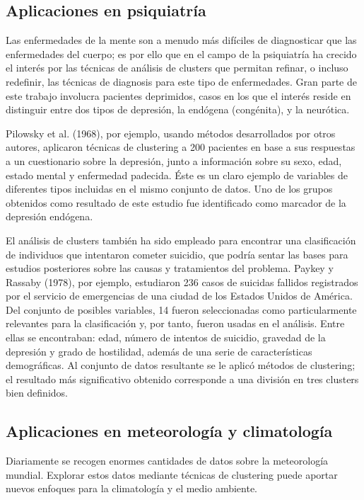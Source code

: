 \subsection{Aplicaciones en psiquiatría}

Las enfermedades de la mente son a menudo más difíciles de diagnosticar que las enfermedades del cuerpo; es por ello que en el campo de la psiquiatría ha crecido el interés por las técnicas de análisis de clusters que permitan refinar, o incluso redefinir, las técnicas de diagnosis para este tipo de enfermedades. Gran parte de este trabajo involucra pacientes deprimidos, casos en los que el interés reside en distinguir entre dos tipos de depresión, la endógena (congénita), y la neurótica.

Pilowsky et al. (1968), por ejemplo, usando métodos desarrollados por otros autores, aplicaron técnicas de clustering a 200 pacientes en base a sus respuestas a un cuestionario sobre la depresión, junto a información sobre su sexo, edad, estado mental y enfermedad padecida. Éste es un claro ejemplo de variables de diferentes tipos incluidas en el mismo conjunto de datos. Uno de los grupos obtenidos como resultado de este estudio fue identificado como marcador de la depresión endógena.

El análisis de clusters también ha sido empleado para encontrar una clasificación de individuos que intentaron cometer suicidio, que podría sentar las bases para estudios posteriores sobre las causas y tratamientos del problema. Paykey y Rassaby (1978), por ejemplo, estudiaron 236 casos de suicidas fallidos registrados por el servicio de emergencias de una ciudad de los Estados Unidos de América. Del conjunto de posibles variables, 14 fueron seleccionadas como particularmente relevantes para la clasificación y, por tanto, fueron usadas en el análisis. Entre ellas se encontraban: edad, número de intentos de suicidio, gravedad de la depresión y grado de hostilidad, además de una serie de características demográficas. Al conjunto de datos resultante se le aplicó métodos de clustering; el resultado más significativo obtenido corresponde a una división en tres clusters bien definidos.

\subsection{Aplicaciones en meteorología y climatología}

Diariamente se recogen enormes cantidades de datos sobre la meteorología mundial. Explorar estos datos mediante técnicas de clustering puede aportar nuevos enfoques para la climatología y el medio ambiente.

